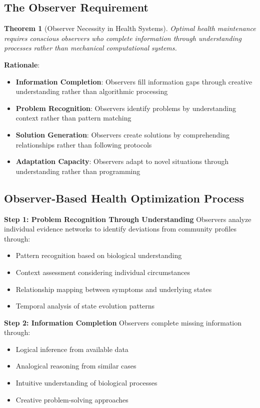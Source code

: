 \documentclass[12pt,a4paper]{article}
\newtheorem{theorem}{Theorem}[section]
\begin{document}
\subsection{The Observer Requirement}

\begin{theorem}[Observer Necessity in Health Systems]
Optimal health maintenance requires conscious observers who complete information through understanding processes rather than mechanical computational systems.
\end{theorem}

\textbf{Rationale}:
\begin{itemize}
\item \textbf{Information Completion}: Observers fill information gaps through creative understanding rather than algorithmic processing
\item \textbf{Problem Recognition}: Observers identify problems by understanding context rather than pattern matching
\item \textbf{Solution Generation}: Observers create solutions by comprehending relationships rather than following protocols
\item \textbf{Adaptation Capacity}: Observers adapt to novel situations through understanding rather than programming
\end{itemize}

\subsection{Observer-Based Health Optimization Process}

\textbf{Step 1: Problem Recognition Through Understanding}
Observers analyze individual evidence networks to identify deviations from community profiles through:
\begin{itemize}
\item Pattern recognition based on biological understanding
\item Context assessment considering individual circumstances  
\item Relationship mapping between symptoms and underlying states
\item Temporal analysis of state evolution patterns
\end{itemize}

\textbf{Step 2: Information Completion}
Observers complete missing information through:
\begin{itemize}
\item Logical inference from available data
\item Analogical reasoning from similar cases
\item Intuitive understanding of biological processes
\item Creative problem-solving approaches
\end{itemize}
\end{document}
